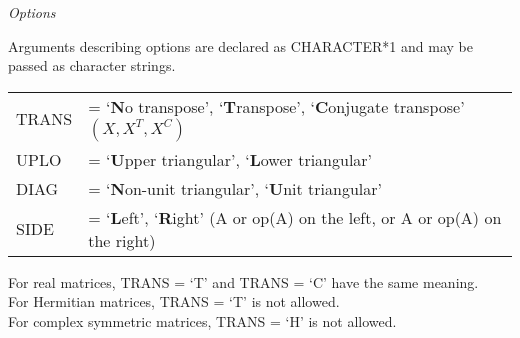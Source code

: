 {\it Options}

\vspace{.25in}
\noindent

Arguments describing options are declared as CHARACTER*1 and may be passed as character strings.

\begin{tabular}{l l}
TRANS  &  = `{\bf N}o transpose',  `{\bf T}ranspose',  `{\bf C}onjugate transpose' $( X, X ^{T}, X^{C} )$ \\
UPLO  &  = `{\bf U}pper triangular',  `{\bf L}ower triangular'\\
DIAG  &  = `{\bf N}on-unit triangular',  `{\bf U}nit triangular'\\
SIDE  &  = `{\bf L}eft',  `{\bf R}ight' (A or op(A) on the left, or A or op(A)
on the right) \\
\end{tabular}

\vspace{.25in}
\noindent
\begin{flushleft}
For real matrices, TRANS = `T' and TRANS = `C' have the same meaning.\\
For Hermitian matrices, TRANS = `T' is not allowed.\\
For complex symmetric matrices, TRANS = `H' is not allowed.\\
\end{flushleft}

\normalsize
